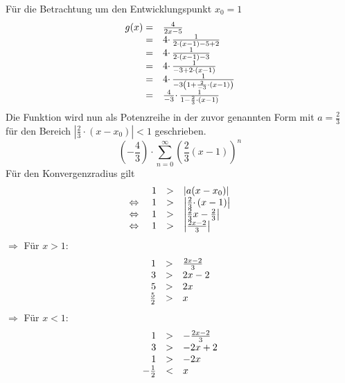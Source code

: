 Für die Betrachtung um den Entwicklungspunkt $\displaystyle x_{0} =1$
\begin{equation*}
	\begin{array}{ r l }
		g( x) = & \frac{4}{2x-5}\\
		= & 4\cdotp \frac{1}{2\cdotp ( x-1) -5+2}\\
		= & 4\cdotp \frac{1}{2\cdotp ( x-1) -3}\\
		= & 4\cdotp \frac{1}{-3+2\cdotp ( x-1)}\\
		= & 4\cdotp \frac{1}{-3\left( 1+\frac{2}{-3} \cdotp ( x-1)\right)}\\
		= & \frac{4}{-3} \cdotp \frac{1}{1-\frac{2}{3} \cdotp ( x-1)}
	\end{array}
\end{equation*}
Die Funktion wird nun als Potenzreihe in der zuvor genannten Form mit $\displaystyle a=\frac{2}{3}$ für den Bereich $\displaystyle \left| \frac{2}{3} \cdotp ( x-x_{0})\right| < 1$ geschrieben.
\begin{equation*}
	\left( -\frac{4}{3}\right) \cdotp \sum _{n=0}^{\infty }\left(\frac{2}{3}( x-1)\right)^{n}
\end{equation*}
Für den Konvergenzradius gilt 
\begin{equation*}
	\begin{array}{ l r c l }
		& 1 &  > & | a( x-x_{0})| \\
		\Leftrightarrow  & \ 1 &  > & \left| \frac{2}{3} \cdotp ( x-1)\right| \\
		\Leftrightarrow  & 1 &  > & \left| \frac{2}{3} x-\frac{2}{3}\right| \\
		\Leftrightarrow  & 1 &  > & \left| \frac{2x-2}{3}\right| 
	\end{array}
\end{equation*}
$\displaystyle \Rightarrow $ Für $\displaystyle x >1$:
\begin{equation*}
	\begin{array}{ r c l }
		1 &  > & \frac{2x-2}{3}\\
		3 &  > & 2x-2\\
		5 &  > & 2x\\
		\frac{5}{2} &  > & x
	\end{array}
\end{equation*}
$\displaystyle \Rightarrow $ Für $\displaystyle x< 1$:
\begin{equation*}
	\begin{array}{ r c l }
		1 &  > & -\frac{2x-2}{3}\\
		3 &  > & -2x+2\\
		1 &  > & -2x\\
		-\frac{1}{2} & <  & x
	\end{array}
\end{equation*}



